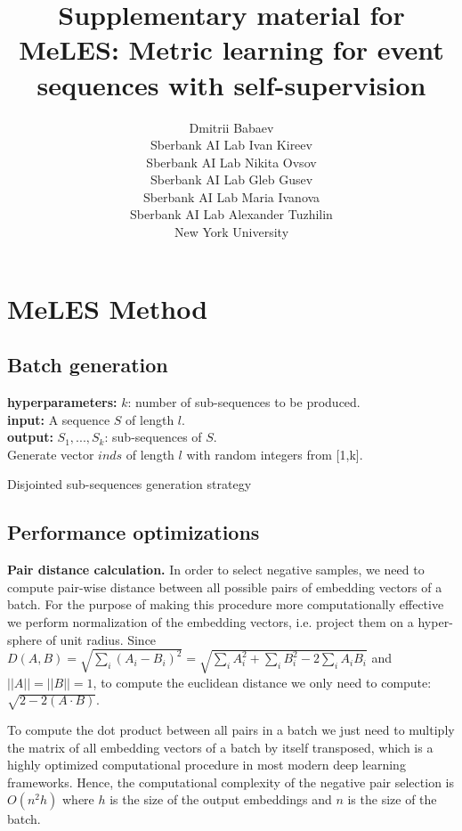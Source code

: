 \documentclass{article}
\title{Supplementary material for MeLES: Metric learning for event sequences with self-supervision}
\author{
Dmitrii Babaev \\
Sberbank AI Lab
\And
Ivan Kireev \\
Sberbank AI Lab
\And
Nikita Ovsov \\
Sberbank AI Lab
\And
Gleb Gusev \\
Sberbank AI Lab
\And
Maria Ivanova \\
Sberbank AI Lab
\And
Alexander Tuzhilin \\
New York University
}
\begin{document}
\maketitle

\section{MeLES Method}

\subsection{Batch generation}

\begin{algorithm}
\SetAlgoLined
\textbf{hyperparameters:} $k$: number of sub-sequences to be produced. \\
\textbf{input:} A sequence $S$ of length $l$. \\
\textbf{output:} $S_1,...,S_k$: sub-sequences of $S$. \\

\BlankLine
Generate vector $inds$ of length $l$ with random integers from [1,k].\\
\caption{Disjointed sub-sequences generation strategy}
\label{alg-disj-ss}

\end{algorithm}

\subsection{Performance optimizations} \label{sec-perf-opt}

\textbf{Pair distance calculation.} In order to select negative samples, we need to compute pair-wise distance between all possible pairs of embedding vectors of a batch. For the purpose of making this procedure more computationally effective we perform normalization of the embedding vectors, i.e. project them on a hyper-sphere of unit radius. Since $D(A,B) = \sqrt{\sum_i(A_i - B_i)^2} = \sqrt{\sum_i A_i^2 + \sum_i B_i^2 - 2\sum_i A_i B_i} $ and $||A||= ||B||=1$, to compute the euclidean distance we only need to compute: $\sqrt{2 - 2(A \cdot B)}$.

To compute the dot product between all pairs in a batch we just need to multiply the matrix of all embedding vectors of a batch by itself transposed, which is a highly optimized computational procedure in most modern deep learning frameworks. Hence, the computational complexity of the negative pair selection is $O(n^2h)$ where $h$ is the size of the output embeddings and $n$ is the size of the batch.
\end{document}
